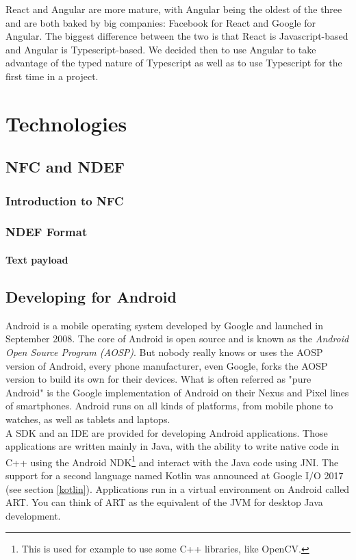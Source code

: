 \documentclass[11pt,a4paper]{report}
\begin{document}
React and Angular are more mature, with Angular being the oldest of the three and are both baked by big companies: Facebook for React and Google for Angular. The biggest difference between the two is that React is Javascript-based and Angular is Typescript-based. We decided then to use Angular to take advantage of the typed nature of Typescript as well as to use Typescript for the first time in a project.

\chapter{Technologies}
\section{NFC and NDEF}
\subsection{Introduction to NFC}
\subsection{NDEF Format}
\subsubsection{Text payload}




\section{Developing for Android}
\label{android_chapter}
Android is a mobile operating system developed by Google and launched in September 2008. The core of Android is open source and is known as the \emph{Android Open Source Program (AOSP)}. But nobody really knows or uses the AOSP version of Android, every phone manufacturer, even Google, forks the AOSP version to build its own for their devices. What is often referred as "pure Android" is the Google implementation of Android on their Nexus and Pixel lines of smartphones. Android runs on all kinds of platforms, from mobile phone to watches, as well as tablets and laptops. \\

A SDK and an IDE are provided for developing Android applications. Those applications are written mainly in Java, with the ability to write native code in C++ using the Android NDK\footnote{This is used for example to use some C++ libraries, like OpenCV.} and interact with the Java code using JNI. The support for a second language named Kotlin was announced at Google I/O 2017 (see section \ref{kotlin}). Applications run in a virtual environment on Android called ART. You can think of ART as the equivalent of the JVM for desktop Java development.
\end{document}
